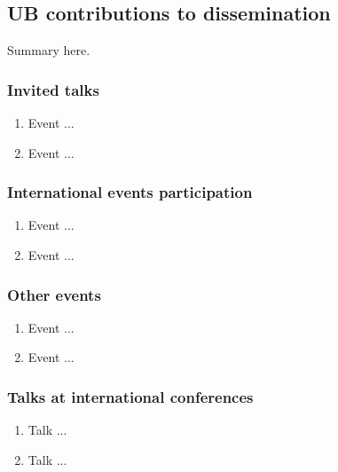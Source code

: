 \subsection{UB contributions to dissemination}

Summary here.

\subsubsection{Invited talks}

\begin{enumerate}
\item  Event ...

\item  Event ...
\end{enumerate}

\subsubsection{International events participation}

\begin{enumerate}

\item  Event ...

\item  Event ...

\end{enumerate}

\subsubsection{Other events}

\begin{enumerate}

\item  Event ...

\item  Event ...

\end{enumerate}

\subsubsection{Talks at international conferences}

\begin{enumerate}
\item  Talk ...

\item  Talk ...
\end{enumerate}


